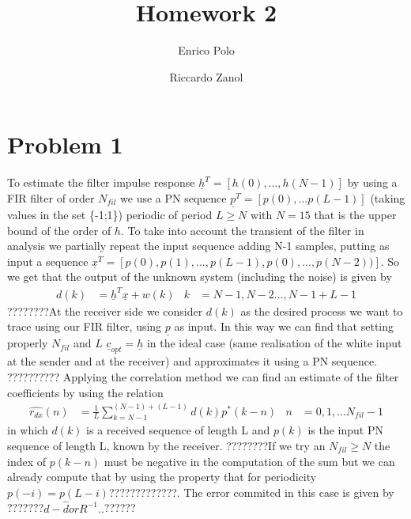 \documentclass{article}
\author{Enrico Polo \and Riccardo Zanol}
\title{Homework 2}
\renewcommand{\vec}[1]{\underline{#1}}
\begin{document}
\maketitle
\section*{Problem 1}
To estimate the filter impulse response $\vec{h}^T = [h(0), ..., h(N-1)]$ by using a FIR filter of order $N_{fil}$ we use a PN sequence $\vec{p}^T = [p(0),...p(L-1)]$ (taking values in the set \{-1;1\}) periodic of period $L\geq N$ with $N=15$ that is the upper bound of the order of $h$. To take into account the transient of the filter in analysis we partially repeat the input sequence adding N-1 samples, putting as input a sequence $\vec{x}^T = [p(0), p(1),...,p(L-1),p(0),...,p(N-2))]$. So we get that the output of the unknown system (including the noise) is given by 
\begin{align*}
d(k)& = \vec{h}^T \vec{x} + w(k)&  k& = N-1,N-2...,N-1+L-1
\end{align*}
????????At the receiver side we consider $d(k)$ as the desired process we want to trace using our FIR filter, using $\vec{p}$ as input. In this way we can find that setting properly $N_{fil}$ and $L$ $\vec{c}_{opt} = \vec{h}$ in the ideal case (same realisation of the white input at the sender and at the receiver) and approximates it using a PN sequence. ??????????
\newline Applying the correlation method we can find an estimate of the filter coefficients by using the relation 
\begin{align*}
\hat{r_{dx}}(n) &= \frac{1}{L} \sum_{k=N-1}^{(N-1) + (L-1)} {d(k)p^*(k-n)} & n&=0,1,...N_{fil} -1
\end{align*}
in which $d(k)$ is a received sequence of length L and $p(k)$ is the input PN sequence of length L, known by the receiver. ????????If we try an $N_{fil} \geq N$ the index of $p(k-n)$ must be negative in the computation of the sum but we can already compute that by using the property that for periodicity $p(-i) = p(L-i)$?????????????. The error commited in this case is given by ???????$d-\hat{d} or R^{-1}..$??????
\end{document}
